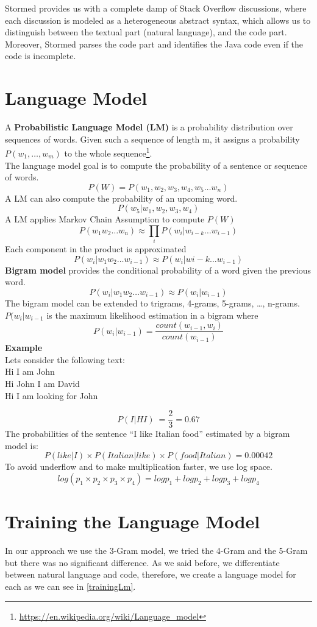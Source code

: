 \documentclass[12pt,mscthesis]{usiinfthesis}
\begin{document}
	Stormed provides us with a complete damp of Stack Overflow discussions, where each discussion is modeled as a heterogeneous abstract syntax, which allows us to distinguish between the textual part (natural language), and the code part. Moreover, Stormed parses the code part and identifies the Java code even if the code is incomplete.
	\newpage
	\section{Language Model}

	A \textbf{Probabilistic Language Model (LM)} is a probability distribution over sequences of words. Given such a sequence of length m, it assigns a probability $P(w_{1},\ldots ,w_{m})$ to the whole sequence\footnote{\url{https://en.wikipedia.org/wiki/Language_model}}.\\
	The language model goal is to compute the probability of a sentence or sequence of words.
	\[P(W) = P(w_{1},w_2,w_3,w_4,w_5\dots w_n)\]
	A LM can also compute the probability of an upcoming word.
	\[P(w_5|w_1,w_2,w_3,w_4)\]
	A LM applies Markov Chain Assumption to compute $P(W)$
	\[P(w_1w_2\dots w_n) \approx \prod_{i} P(w_i|w_{i-k} \dots w_{i-1})\]
	Each component in the product is approximated
	\[P(w_i |w_1w_2\dots w_{i-1}) \approx P(w_i |w{i-k} \dots w_{i-1})\]
	\textbf{Bigram model} provides the conditional probability of a word given the previous word.
	\[P(w_i |w_1w_2 \dots w_{i-1})\approx P(w_i |w_{i-1})\]
	The bigram model can be extended to trigrams, 4-grams, 5-grams, \dots , n-grams.\\
	$P(w_i |w_{i-1}$ is the maximum likelihood estimation in a bigram where 
	\[P(w_{i}|w_{{i-1}})=\frac{count(w_{{i-1}},w_{i})} {count(w_{{i-1}})}\]
	\textbf{Example}\\
	Lets consider the following text:\\
	Hi I am John\\
	Hi John I am David\\
	Hi I am looking for John

	\[P(I|HI)\ = \frac{2}{3} = 0.67\]
	The probabilities of the sentence ``I like Italian food'' estimated by a bigram model is:
	\[P(like|I) \times P(Italian|like) \times P(food|Italian)= 0.00042\]
	To avoid underflow and to make multiplication faster, we use log space.
	\[log( p_1 \times p_2 \times p_3 \times p_4 ) = log p_1 + log p_2 + log p_3 + log p_4\]



	\section{Training the Language Model}
	In our approach we use the 3-Gram model, we tried the 4-Gram and the 5-Gram but there was no significant difference. As we said before, we differentiate between natural language and code, therefore, we create a language model for each as we can see in \cref{trainingLm}.\\
\end{document}
